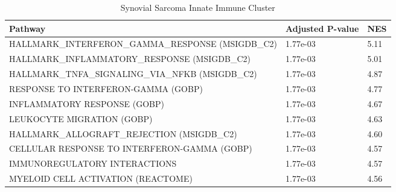 \documentclass[varwidth=1000pt,border=10pt,convert={size=640x}]{standalone}
\begin{document}
	\begin{table}
	\caption{Synovial Sarcoma Innate Immune Cluster}
	\begin{tabular}{L{10cm}R{1.5cm}R{1.5cm}}
	\toprule
	Pathway &      Adjusted P-value &   NES \\
	\midrule
	HALLMARK\_INTERFERON\_GAMMA\_RESPONSE (MSIGDB\_C2) &  1.77e-03 &  5.11 \\
	HALLMARK\_INFLAMMATORY\_RESPONSE (MSIGDB\_C2) &  1.77e-03 &  5.01 \\
	HALLMARK\_TNFA\_SIGNALING\_VIA\_NFKB (MSIGDB\_C2) &  1.77e-03 &  4.87 \\
	RESPONSE TO INTERFERON-GAMMA (GOBP) &  1.77e-03 &  4.77 \\
	INFLAMMATORY RESPONSE (GOBP) &  1.77e-03 &  4.67 \\
	LEUKOCYTE MIGRATION (GOBP) &  1.77e-03 &  4.63 \\
	HALLMARK\_ALLOGRAFT\_REJECTION (MSIGDB\_C2) &  1.77e-03 &  4.60 \\
	CELLULAR RESPONSE TO INTERFERON-GAMMA (GOBP) &  1.77e-03 &  4.57 \\
	IMMUNOREGULATORY INTERACTIONS  &  1.77e-03 &  4.57 \\
	MYELOID CELL ACTIVATION (REACTOME) &  1.77e-03 &  4.56 \\
	\bottomrule
\end{tabular}
\end{table}
\end{document}
